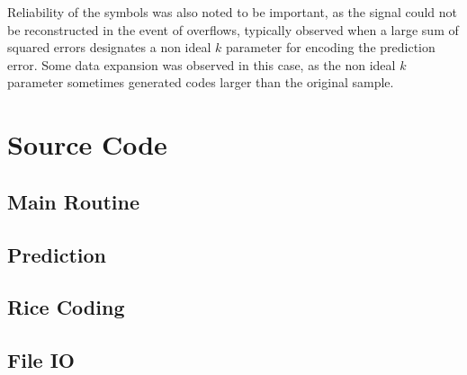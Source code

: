 \documentclass{article}
\begin{document}
Reliability of the symbols was also noted to be important, as the signal could not be reconstructed in the event of overflows, typically observed when a large sum of squared errors designates a non ideal $k$ parameter for encoding the prediction error. Some data expansion was observed in this case, as the non ideal $k$ parameter sometimes generated codes larger than the original sample. \\ 

\newpage
\appendix
{}
\section*{Source Code} \label{App:code}
\subsection*{Main Routine}

\newpage
\subsection*{Prediction}


\newpage
\subsection*{Rice Coding}


\newpage
\subsection*{File IO}







\end{document}
